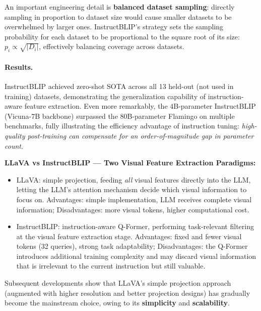 An important engineering detail is \textbf{balanced dataset sampling}:
directly sampling in proportion to dataset size would cause smaller datasets to be overwhelmed by larger ones.
InstructBLIP's strategy sets the sampling probability for each dataset to be proportional to the square root of its size:
$p_i \propto \sqrt{|D_i|}$, effectively balancing coverage across datasets.

\paragraph{Results.}
InstructBLIP achieved zero-shot SOTA across all 13 held-out (not used in training) datasets,
demonstrating the generalization capability of instruction-aware feature extraction.
Even more remarkably, the 4B-parameter InstructBLIP (Vicuna-7B backbone)
surpassed the 80B-parameter Flamingo on multiple benchmarks,
fully illustrating the efficiency advantage of instruction tuning:
\textit{high-quality post-training can compensate for an order-of-magnitude gap in parameter count}.

\begin{solutionbox}
\textbf{LLaVA vs InstructBLIP --- Two Visual Feature Extraction Paradigms:}
\begin{itemize}[leftmargin=2em]
  \item LLaVA: simple projection, feeding \textit{all} visual features directly into the LLM,
    letting the LLM's attention mechanism decide which visual information to focus on.
    Advantages: simple implementation, LLM receives complete visual information; Disadvantages: more visual tokens, higher computational cost.
  \item InstructBLIP: instruction-aware Q-Former,
    performing task-relevant filtering at the visual feature extraction stage.
    Advantages: fixed and fewer visual tokens (32 queries), strong task adaptability;
    Disadvantages: the Q-Former introduces additional training complexity and may discard visual information that is irrelevant to the current instruction but still valuable.
\end{itemize}
Subsequent developments show that LLaVA's simple projection approach (augmented with higher resolution and better projection designs)
has gradually become the mainstream choice, owing to its \textbf{simplicity} and \textbf{scalability}.
\end{solutionbox}

